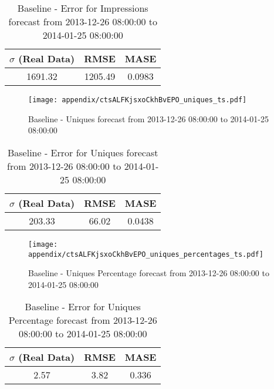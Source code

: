 \begin{table}[H]
\centering
\footnotesize
\begin{tabular}{ccc}
$\sigma$ (Real Data) & RMSE & MASE   \\ \hline
1691.32 & 1205.49 & 0.0983 \\
\end{tabular}

\vspace{0.5cm}

\caption{
Baseline - Error for Impressions forecast from 2013-12-26 08:00:00 to 2014-01-25 08:00:00}
\end{table}

\begin{figure}[H] \begin{center} \leavevmode
\texttt{[image: appendix/ctsALFKjsxoCkhBvEPO\_uniques\_ts.pdf]} \caption{
Baseline - Uniques forecast from 2013-12-26 08:00:00 to 2014-01-25 08:00:00} \label{fig:appendix/ctsALFKjsxoCkhBvEPO_uniques_ts.pdf} \end{center}
\end{figure}

\begin{table}[H]
\centering
\footnotesize
\begin{tabular}{ccc}
$\sigma$ (Real Data) & RMSE & MASE   \\ \hline
203.33 & 66.02 & 0.0438 \\
\end{tabular}

\vspace{0.5cm}

\caption{
Baseline - Error for Uniques forecast from 2013-12-26 08:00:00 to 2014-01-25 08:00:00}
\end{table}

\begin{figure}[H] \begin{center} \leavevmode
\texttt{[image: appendix/ctsALFKjsxoCkhBvEPO\_uniques\_percentages\_ts.pdf]} \caption{
Baseline - Uniques Percentage forecast from 2013-12-26 08:00:00 to 2014-01-25 08:00:00} \label{fig:appendix/ctsALFKjsxoCkhBvEPO_uniques_percentages_ts.pdf} \end{center}
\end{figure}

\begin{table}[H]
\centering
\footnotesize
\begin{tabular}{ccc}
$\sigma$ (Real Data) & RMSE & MASE   \\ \hline
2.57 & 3.82 & 0.336 \\
\end{tabular}

\vspace{0.5cm}

\caption{
Baseline - Error for Uniques Percentage forecast from 2013-12-26 08:00:00 to 2014-01-25 08:00:00}
\end{table}

